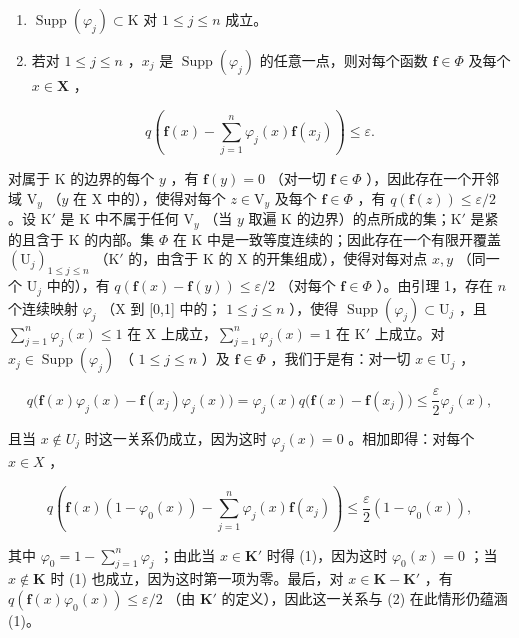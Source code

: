 \begin{enumerate}
\def\labelenumi{(\roman{enumi})}
\item
  \(\operatorname{Supp}(\varphi_j) \subset \mathrm{K}\) 对 \(1 \leqslant j \leqslant n\) 成立。
\item
  若对 \(1 \leqslant j \leqslant n\) ，\(x_j\) 是 \(\operatorname{Supp}(\varphi_j)\) 的任意一点，则对每个函数 \(\mathbf{f} \in \Phi\) 及每个 \(x \in \mathbf{X}\) ，
\end{enumerate}

\[
q \left(\mathbf {f} (x) - \sum_ {j = 1} ^ {n} \varphi_ {j} (x) \mathbf {f} \left(x _ {j}\right)\right) \leqslant \varepsilon .\tag{1}
\]

对属于 K 的边界的每个 \(y\) ，有 \(\mathbf{f}(y) = 0\) （对一切 \(\mathbf{f} \in \Phi\) ），因此存在一个开邻域 \(\mathrm{V}_y\) （\(y\) 在 X 中的），使得对每个 \(z \in \mathrm{V}_y\) 及每个 \(\mathbf{f} \in \Phi\) ，有 \(q(\mathbf{f}(z)) \leqslant \varepsilon / 2\) 。设 \(\mathrm{K}'\) 是 K 中不属于任何 \(\mathrm{V}_y\) （当 \(y\) 取遍 K 的边界）的点所成的集；\(\mathrm{K}'\) 是紧的且含于 K 的内部。集 \(\Phi\) 在 K 中是一致等度连续的；因此存在一个有限开覆盖 \((\mathrm{U}_j)_{1 \leqslant j \leqslant n}\) （\(\mathrm{K}'\) 的，由含于 K 的 X 的开集组成），使得对每对点 \(x, y\) （同一个 \(\mathrm{U}_j\) 中的），有 \(q(\mathbf{f}(x) - \mathbf{f}(y)) \leqslant \varepsilon / 2\) （对每个 \(\mathbf{f} \in \Phi\) ）。由引理 1，存在 \(n\) 个连续映射 \(\varphi_j\) （X 到 {[}0,1{]} 中的； \(1 \leqslant j \leqslant n\) ），使得 \(\operatorname{Supp}(\varphi_j) \subset \mathrm{U}_j\) ，且 \(\sum_{j=1}^{n} \varphi_j(x) \leqslant 1\) 在 X 上成立，\(\sum_{j=1}^{n} \varphi_j(x) = 1\) 在 \(\mathrm{K}'\) 上成立。对 \(x_j \in \operatorname{Supp}(\varphi_j)\) （ \(1 \leqslant j \leqslant n\) ）及 \(\mathbf{f} \in \Phi\) ，我们于是有：对一切 \(x \in \mathrm{U}_j\) ，

\[
q \big (\mathbf {f} (x) \varphi_ {j} (x) - \mathbf {f} (x _ {j}) \varphi_ {j} (x) \big) = \varphi_ {j} (x) q \big (\mathbf {f} (x) - \mathbf {f} (x _ {j}) \big) \leqslant \frac {\varepsilon}{2} \varphi_ {j} (x),
\]

且当 \(x \notin U_{j}\) 时这一关系仍成立，因为这时 \(\varphi_{j}(x) = 0\) 。相加即得：对每个 \(x \in X\) ，

\[
q \left(\mathbf {f} (x) \left(1 - \varphi_ {0} (x)\right) - \sum_ {j = 1} ^ {n} \varphi_ {j} (x) \mathbf {f} \left(x _ {j}\right)\right) \leqslant \frac {\varepsilon}{2} \left(1 - \varphi_ {0} (x)\right),\tag{2}
\]

其中 \(\varphi_0 = 1 - \sum_{j=1}^{n} \varphi_j\) ；由此当 \(x \in \mathbf{K}'\) 时得 (1)，因为这时 \(\varphi_0(x) = 0\) ；当 \(x \notin \mathbf{K}\) 时 (1) 也成立，因为这时第一项为零。最后，对 \(x \in \mathbf{K} - \mathbf{K}'\) ，有 \(q(\mathbf{f}(x)\varphi_0(x)) \leqslant \varepsilon/2\) （由 \(\mathbf{K}'\) 的定义），因此这一关系与 (2) 在此情形仍蕴涵 (1)。

